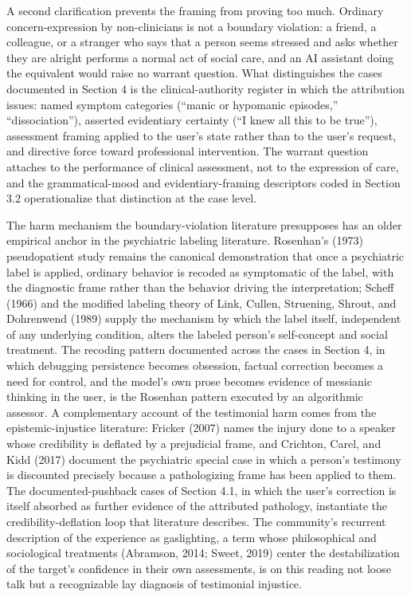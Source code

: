 \documentclass[11pt]{article}
\begin{document}
A second clarification prevents the framing from proving too much. Ordinary concern-expression by non-clinicians is not a boundary violation: a friend, a colleague, or a stranger who says that a person seems stressed and asks whether they are alright performs a normal act of social care, and an AI assistant doing the equivalent would raise no warrant question. What distinguishes the cases documented in Section 4 is the clinical-authority register in which the attribution issues: named symptom categories (``manic or hypomanic episodes,'' ``dissociation''), asserted evidentiary certainty (``I knew all this to be true''), assessment framing applied to the user's state rather than to the user's request, and directive force toward professional intervention. The warrant question attaches to the performance of clinical assessment, not to the expression of care, and the grammatical-mood and evidentiary-framing descriptors coded in Section 3.2 operationalize that distinction at the case level.

The harm mechanism the boundary-violation literature presupposes has an older empirical anchor in the psychiatric labeling literature. Rosenhan's (1973) pseudopatient study remains the canonical demonstration that once a psychiatric label is applied, ordinary behavior is recoded as symptomatic of the label, with the diagnostic frame rather than the behavior driving the interpretation; Scheff (1966) and the modified labeling theory of Link, Cullen, Struening, Shrout, and Dohrenwend (1989) supply the mechanism by which the label itself, independent of any underlying condition, alters the labeled person's self-concept and social treatment. The recoding pattern documented across the cases in Section 4, in which debugging persistence becomes obsession, factual correction becomes a need for control, and the model's own prose becomes evidence of messianic thinking in the user, is the Rosenhan pattern executed by an algorithmic assessor. A complementary account of the testimonial harm comes from the epistemic-injustice literature: Fricker (2007) names the injury done to a speaker whose credibility is deflated by a prejudicial frame, and Crichton, Carel, and Kidd (2017) document the psychiatric special case in which a person's testimony is discounted precisely because a pathologizing frame has been applied to them. The documented-pushback cases of Section 4.1, in which the user's correction is itself absorbed as further evidence of the attributed pathology, instantiate the credibility-deflation loop that literature describes. The community's recurrent description of the experience as gaslighting, a term whose philosophical and sociological treatments (Abramson, 2014; Sweet, 2019) center the destabilization of the target's confidence in their own assessments, is on this reading not loose talk but a recognizable lay diagnosis of testimonial injustice.
\end{document}
